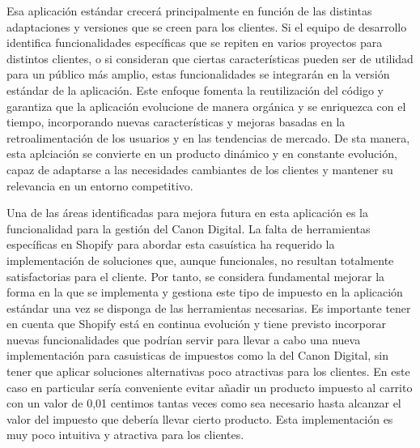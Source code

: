 \documentclass[11pt]{article}
\begin{document}
Esa aplicación estándar crecerá principalmente en función de las distintas adaptaciones y versiones que se creen para los clientes. Si el equipo de desarrollo identifica funcionalidades
específicas que se repiten en varios proyectos para distintos clientes, o si consideran que ciertas características pueden ser de utilidad para un público más amplio, estas
funcionalidades se integrarán en la versión estándar de la aplicación. Este enfoque fomenta la reutilización del código y garantiza que la aplicación evolucione de manera
orgánica y se enriquezca con el tiempo, incorporando nuevas características y mejoras basadas en la retroalimentación de los usuarios y en las tendencias de mercado.
De sta manera, esta aplciación se convierte en un producto dinámico y en constante evolución, capaz de adaptarse a las necesidades cambiantes de los clientes y mantener 
su relevancia en un entorno competitivo.

Una de las áreas identificadas para mejora futura en esta aplicación es la funcionalidad para la gestión del Canon Digital. La falta de herramientas específicas en Shopify
para abordar esta casuística ha requerido la implementación de soluciones que, aunque funcionales, no resultan totalmente satisfactorias para el cliente.
Por tanto, se considera fundamental mejorar la forma en la que se implementa y gestiona este tipo de impuesto en la aplicación estándar una vez se disponga
de las herramientas necesarias. Es importante tener en cuenta que Shopify está en continua evolución y tiene previsto incorporar nuevas funcionalidades que podrían servir
para llevar a cabo una nueva implementación para casuisticas de impuestos como la del Canon Digital, sin tener que aplicar soluciones alternativas poco atractivas para los clientes. En este caso en particular
sería conveniente evitar añadir un producto impuesto al carrito con un valor de 0,01 centimos tantas veces como sea necesario hasta alcanzar el valor del impuesto que debería llevar cierto producto. Esta implementación
es muy poco intuitiva y atractiva para los clientes.

\clearpage
\end{document}

